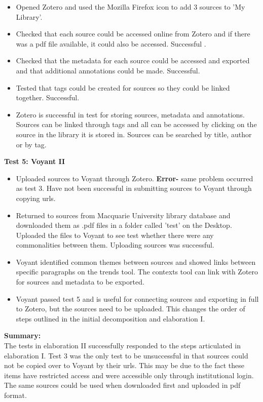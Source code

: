 \documentclass{article}
\begin{document}
\begin{itemize}
    \item Opened Zotero and used the Mozilla Firefox icon to add 3 sources to 'My Library'.
    \item Checked that each source could be accessed online from Zotero and if there was a pdf file available, it could also be accessed. Successful .
    \item Checked that the metadata for each source could be accessed and exported and that additional annotations could be made. Successful.
    \item Tested that tags could be created for sources so they could be linked together. Successful.
    \item Zotero is successful in test for storing sources, metadata and annotations. Sources can be linked through tags and all can be accessed by clicking on the source in the library it is stored in. Sources can be searched by title, author or by tag.
    \end{itemize}
\textbf{Test 5: Voyant II}
\begin{itemize}
    \item Uploaded sources to Voyant through Zotero. \textbf{Error-} same problem occurred as test 3. Have not been successful in submitting sources to Voyant through copying urls. 
    \item Returned to sources from Macquarie University library database and downloaded them as .pdf files in a folder called 'test' on the Desktop. Uploaded the files to Voyant to see test whether there were any commonalities between them. Uploading sources was successful.
    \item Voyant identified common themes between sources and showed links between specific paragraphs on the trends tool. The contexts tool can link with Zotero for sources and metadata to be exported.
    \item Voyant passed test 5 and is useful for connecting sources and exporting in full to Zotero, but the sources need to be uploaded. This changes the order of steps outlined in the initial decomposition and elaboration I. 
\end{itemize}
\textbf{Summary:}\\
The tests in elaboration II successfully responded to the steps articulated in elaboration I. Test 3 was the only test to be unsuccessful in that sources could not be copied over to Voyant by their urls. This may be due to the fact these items have restricted access and were accessible only through institutional login. The same sources could be used when downloaded first and uploaded in pdf format. \\
\end{document}
